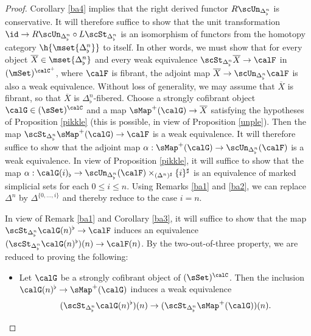 \begin{proof}
Corollary \ref{ba4} implies that the right derived functor $R \scUn_{\Delta^{n}_{\flat}}$ is conservative. 
It will therefore suffice to show that the unit transformation $\id \rightarrow R \scUn_{\Delta^{n}_{\flat}}
\circ L \scSt_{\Delta^{n}_{\flat}}$ is an isomorphism of functors from the homotopy category
$\h{\mset{\Delta^{n}_{\flat}}}$ to itself. In other words, we must show that for every object
$\overline{X} \in \mset{ \Delta^{n}_{\flat} }$ and every weak equivalence
$\scSt_{ \Delta^{n}_{\flat}} \overline{X} \rightarrow \calF$ in $(\mSet)^{\calC^{+}}$, where
$\calF$ is fibrant, the adjoint map $\overline{X} \rightarrow \scUn_{ \Delta^{n}_{\flat}} \calF$
is also a weak equivalence. Without loss of generality, we may assume that $\overline{X}$ is fibrant, so that $\overline{X}$ is $\Delta^n_{\flat}$-fibered. Choose a strongly cofibrant object
$\calG \in (\sSet)^{\calC}$ and a map $\sMap^{+}(\calG) \rightarrow \overline{X}$
satisfying the hypotheses of Proposition \ref{pikkle} (this is possible, in view of Proposition \ref{unple}). Then the map $\scSt_{\Delta^{n}_{\flat}} \sMap^{+}(\calG) \rightarrow \calF$ is a weak equivalence.
It will therefore suffice to show that the adjoint map $\alpha: \sMap^{+}(\calG) \rightarrow \scUn_{\Delta^{n}_{\flat}}(\calF)$ is a weak equivalence. In view of Proposition \ref{pikkle}, it will suffice to show that
the map $\alpha: \calG(i)_{\flat} \rightarrow \scUn_{\Delta^{n}_{\flat}}(\calF) \times_{ (\Delta^n)^{\sharp}} \{i\}^{\sharp}$ is an equivalence of marked simplicial sets for each $0 \leq i \leq n$. Using Remarks \ref{ba1} and \ref{ba2}, we can replace
$\Delta^{n}$ by $\Delta^{ \{0, \ldots, i \} }$ and thereby reduce to the case $i = n$. 

In view of Remark \ref{ba1} and Corollary \ref{ba3}, it will suffice to show that the map
$\scSt_{\Delta^{n}_{\flat}} \calG(n)^{\flat} \rightarrow \calF$ induces an equivalence
$(\scSt_{\Delta^{n}_{\flat}} \calG(n)^{\flat})(n) \rightarrow \calF(n)$. By the two-out-of-three property, we are reduced to proving the following:

\begin{itemize}
\item[$(\ast)$] Let $\calG$ be a strongly cofibrant object of $(\sSet)^{\calC}$. Then the inclusion
$\calG(n)^{\flat} \rightarrow \sMap^{+}(\calG)$ induces a weak equivalence
$$(\scSt_{ \Delta^{n}_{\flat} } \calG(n)^{\flat})(n) \rightarrow (\scSt_{\Delta^{n}_{\flat}} \sMap^{+}(\calG))(n).$$
\end{itemize}


\end{proof}
